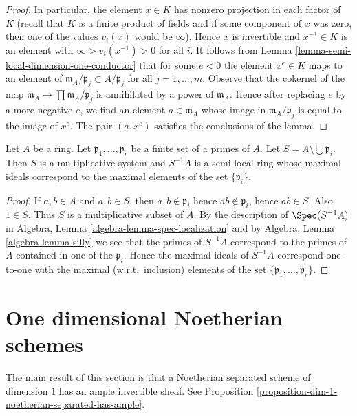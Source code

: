 \begin{proof}
\medskip\noindent
In particular, the element $x \in K$ has nonzero projection
in each factor of $K$ (recall that $K$ is a finite product of
fields and if some component of $x$ was zero, then one
of the values $v_i(x)$ would be $\infty$). Hence $x$ is
invertible and $x^{-1} \in K$ is an element with
$\infty > v_i(x^{-1}) > 0$ for all $i$. It follows from
Lemma \ref{lemma-semi-local-dimension-one-conductor} that
for some $e < 0$ the element $x^e \in K$ maps to an element of
$\mathfrak m_A/\mathfrak p_j \subset A/\mathfrak p_j$ for all
$j = 1, \ldots, m$. Observe that the cokernel of the map
$\mathfrak m_A \to \prod \mathfrak m_A/\mathfrak p_j$ is
annihilated by a power of $\mathfrak m_A$. Hence after replacing
$e$ by a more negative $e$, we find an element $a \in \mathfrak m_A$
whose image in $\mathfrak m_A/\mathfrak p_j$ is equal to
the image of $x^e$. The pair $(a, x^e)$ satisfies the
conclusions of the lemma.
\end{proof}

\begin{lemma}
\label{lemma-localization-semi-local}
Let $A$ be a ring. Let $\mathfrak p_1, \ldots, \mathfrak p_r$
be a finite set of a primes of $A$. Let
$S = A \setminus \bigcup \mathfrak p_i$. Then $S$ is a multiplicative
system and $S^{-1}A$ is a semi-local ring whose maximal ideals
correspond to the maximal elements of the set $\{\mathfrak p_i\}$.
\end{lemma}

\begin{proof}
If $a, b \in A$ and $a, b \in S$, then $a, b \not \in \mathfrak p_i$
hence $ab \not \in \mathfrak p_i$, hence $ab \in S$. Also $1 \in S$.
Thus $S$ is a multiplicative subset of $A$. By the description of
$\Spec(S^{-1}A)$ in
Algebra, Lemma \ref{algebra-lemma-spec-localization}
and by
Algebra, Lemma \ref{algebra-lemma-silly}
we see that the primes of $S^{-1}A$ correspond to the primes of
$A$ contained in one of the $\mathfrak p_i$.
Hence the maximal ideals of $S^{-1}A$ correspond one-to-one with the
maximal (w.r.t.\ inclusion) elements of the set
$\{\mathfrak p_1, \ldots, \mathfrak p_r\}$.
\end{proof}




\section{One dimensional Noetherian schemes}
\label{section-dimension-one}

\noindent
The main result of this section is that a
Noetherian separated scheme of dimension $1$ has an
ample invertible sheaf. See
Proposition \ref{proposition-dim-1-noetherian-separated-has-ample}.

